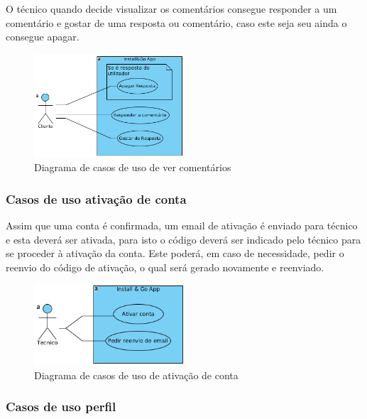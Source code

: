O técnico quando decide visualizar os comentários consegue responder a 
um comentário e gostar de uma resposta ou comentário, caso este 
seja seu ainda o consegue apagar.

\begin{figure}[htb]
    \centering
    
    \includegraphics[width=0.5\textwidth]{images/diagramas/casos_de_uso/use_case_topic_comments.png}
    \caption{Diagrama de casos de uso de ver comentários}
    \label{fig:12}
\end{figure}

\subsubsection{Casos de uso ativação de conta}

Assim que uma conta é confirmada, um email de ativação é enviado para técnico e esta deverá ser ativada,
para isto o código deverá ser indicado pelo técnico para se proceder à ativação da conta. Este poderá,
em caso de necessidade, pedir o reenvio do código de ativação, o qual será gerado novamente e reenviado.

\begin{figure}[htb]
    \centering
    
    \includegraphics[width=0.5\textwidth]{images/diagramas/casos_de_uso/use_case_account_validation.png}
    \caption{Diagrama de casos de uso de ativação de conta}
    \label{fig:13}
\end{figure}

\subsubsection{Casos de uso perfil}

